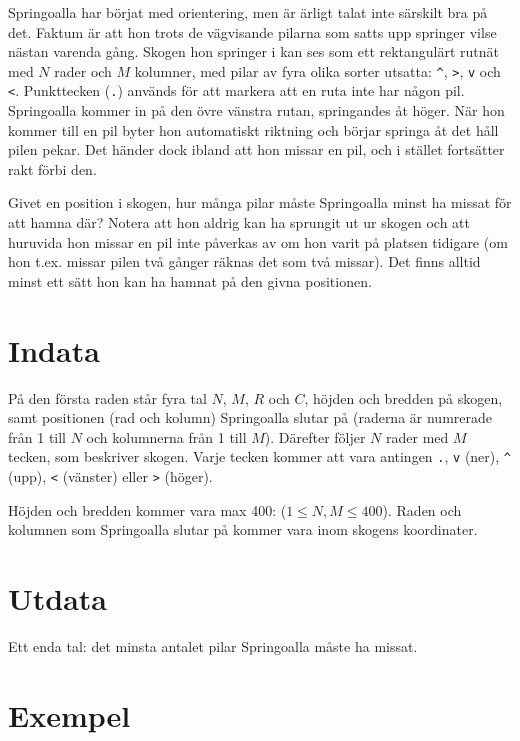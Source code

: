 
Springoalla har börjat med orientering, men är ärligt talat inte
särskilt bra på det. Faktum är att hon trots de vägvisande pilarna
som satts upp springer vilse nästan varenda gång. Skogen hon springer
i kan ses som ett rektangulärt rutnät med $N$ rader och $M$ kolumner,
med pilar av fyra olika sorter utsatta: \texttt{\^}, \texttt{>},
\texttt{v} och \texttt{<}.
Punkttecken (\texttt{.}) används för att markera att en ruta inte har någon
pil. Springoalla
kommer in på den övre vänstra rutan, springandes åt höger. När hon
kommer till en pil byter hon automatiskt riktning och börjar springa
åt det håll pilen pekar. Det händer dock ibland att hon missar en
pil, och i stället fortsätter rakt förbi den.

Givet en position i skogen, hur många pilar måste Springoalla minst ha
missat för att hamna där? Notera att hon aldrig kan ha sprungit ut ur
skogen och att huruvida hon missar en pil inte påverkas av om hon varit
på platsen tidigare (om hon t.ex. missar pilen två gånger räknas det
som två missar). Det finns alltid minst ett sätt hon kan ha hamnat på den givna positionen.

\section*{Indata}

På den första raden står fyra tal $N$, $M$, $R$ och $C$, höjden och
bredden på skogen, samt positionen (rad och kolumn) Springoalla slutar
på (raderna är numrerade från 1 till $N$ och kolumnerna från 1 till
$M$). Därefter följer $N$ rader med $M$ tecken, som beskriver skogen.
Varje tecken kommer att vara antingen \texttt{.}, \texttt{v} (ner),
\texttt{\^} (upp), \texttt{<} (vänster) eller \texttt{>} (höger).

Höjden och bredden kommer vara max 400: ($1 \leq N,M \leq 400$). Raden och kolumnen som
Springoalla slutar på kommer vara inom skogens koordinater.

\section*{Utdata}

Ett enda tal: det minsta antalet pilar Springoalla måste ha missat.

\section*{Exempel}

